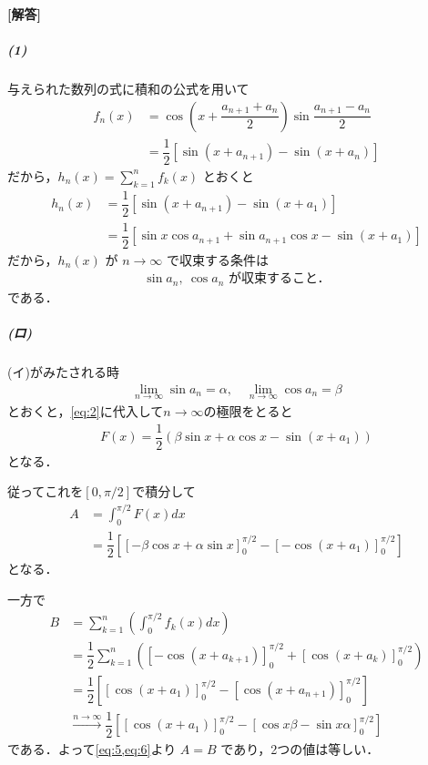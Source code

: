 \documentclass[../../main.tex]{subfiles}
\begin{document}
\begin{oframed}
  
\end{oframed}

{\bf [解答]}

\subparagraph{(1)}

与えられた数列の式に積和の公式を用いて
\begin{align}
  f_n(x)
  & = \cos\left(x + \dfrac{a_{n+1}+a_n}{2}\right) \sin\dfrac{a_{n+1}-a_n}{2} \\
  &= \dfrac{1}{2} \left[ \sin(x+a_{n+1}) - \sin(x+a_n) \right] \label{eq:1}
\end{align}
だから，$h_n(x) = \sum_{k=1}^n f_k(x)$ とおくと
\begin{align}
  h_n(x)
  &= \dfrac{1}{2} \left[ \sin(x+a_{n+1}) - \sin(x+a_1) \right]  \\
  &= \dfrac{1}{2} \left[ \sin x \cos a_{n+1} + \sin a_{n+1} \cos x - \sin(x+a_1) \right] \label{eq:2}
\end{align}
だから，$h_n(x)$ が $n \to \infty$ で収束する条件は
\begin{align}
  \sin a_n, \ \cos a_n \text{ が収束すること．}
\end{align}
である．

\subparagraph{(ロ)}

(イ)がみたされる時
\begin{align}
  \lim_{n\to\infty} \sin a_n = \alpha, \quad
  \lim_{n\to\infty} \cos a_n = \beta \label{eq:3}
\end{align}
とおくと，\cref{eq:2}に代入して$n\to\infty$の極限をとると
\begin{align}
  F(x) = \dfrac{1}{2} \left( \beta \sin x + \alpha \cos x - \sin(x+a_1) \right) \label{eq:4}
\end{align}
となる．

従ってこれを$[0,\pi/2]$で積分して
\begin{align}
  A
  & = \int_0^{\pi/2} F(x) dx \\
  &= \dfrac{1}{2} \left[ \left[ -\beta \cos x + \alpha \sin x \right]_0^{\pi/2} - \left[ -\cos(x+a_1) \right]_0^{\pi/2} \right] \label{eq:5}
\end{align}
となる．

一方で
\begin{align}
  B
  &= \sum_{k=1}^n \left( \int_0^{\pi/2} f_k(x) dx \right) \\
  &= \dfrac{1}{2} \sum_{k=1}^n \left( \left[ -\cos(x+a_{k+1}) \right]_0^{\pi/2} + \left[ \cos(x+a_k) \right]_0^{\pi/2} \right) \\
  &= \dfrac{1}{2} \left[ \left[ \cos(x+a_1) \right]_0^{\pi/2} - \left[ \cos(x+a_{n+1}) \right]_0^{\pi/2} \right] \\
  &\xrightarrow{n\to\infty} \dfrac{1}{2} \left[ \left[ \cos(x+a_1) \right]_0^{\pi/2} - \left[ \cos x \beta - \sin x \alpha \right]_0^{\pi/2} \right] \label{eq:6}
\end{align}
である．よって\cref{eq:5,eq:6}より $A = B$ であり，2つの値は等しい．
\end{document}
